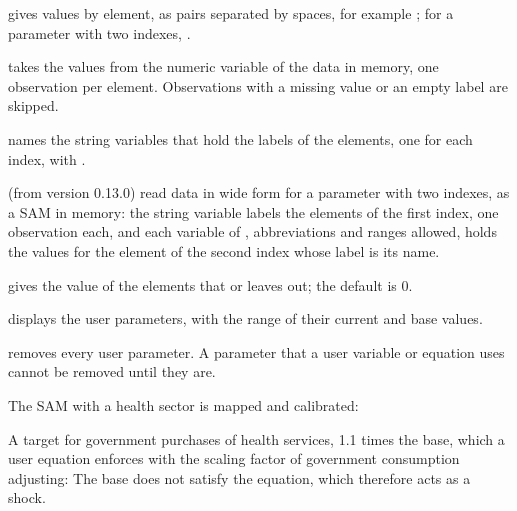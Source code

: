 
\begin{optdesc}
\item[\optarg{val}{ues}{spec}] gives values by element, as
\cmd{:}\argu{\#} pairs separated by spaces, for example
; for a parameter with two indexes,
\cmd{:}\argu{\#}.

\item[\optarg{}{from}{varname}] takes the values from the numeric variable
 of the data in memory, one observation per element.
Observations with a missing value or an empty label are skipped.

\item[\optarg{lab}{els}{varlist}] names the string variables that hold the
labels of the elements, one for each index, with .

\item[\optarg{}{from}{varlist} \optarg{lab}{els}{varname}] (from version
0.13.0) read data in wide form for a parameter with two indexes, as a SAM in
memory: the string variable  labels the elements of the first
index, one observation each, and each variable of ,
abbreviations and ranges allowed, holds the values for the element of the
second index whose label is its name.

\item[\optarg{def}{ault}{\#}] gives the value of the elements that
 or  leaves out; the default is 0.

\item[\opt{}{list}] displays the user parameters, with the range of their
current and base values.

\item[\opt{}{clear}] removes every user parameter. A parameter that a user
variable or equation uses cannot be removed until they are.
\end{optdesc}


The SAM with a health sector is mapped and calibrated:


A target for government purchases of health services, 1.1 times the base,
which a user equation enforces with the scaling factor of government
consumption adjusting:
The base does not satisfy the equation, which therefore acts as a shock.

